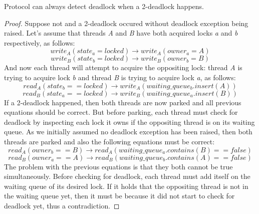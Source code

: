 \begin{lemma}
Protocol can always detect deadlock when a 2-deadlock happens.
\end{lemma}
\begin{proof}
Suppose not and a 2-deadlock occured without deadlock exception being raised.
Let's assume that threads \emph{A} and \emph{B} have both acquired locks \emph{a} and \emph{b} respectively, as follows:
\begin{equation}
write_{A}(state_{a} = locked) \rightarrow write_{A}(owner_{a} = A)
\end{equation}
\begin{equation}
write_{B}(state_{b} = locked) \rightarrow write_{B}(owner_{b} = B)
\end{equation}
And now each thread will attempt to acquire the oppositing lock: thread \emph{A} is trying to acquire lock \emph{b} and thread \emph{B} is trying to acquire lock \emph{a}, as follows:
\begin{equation}
read_{A}(state_{b} == locked) \rightarrow write_{A}(waiting\_queue_{b}.insert(A))
\end{equation}
\begin{equation}
read_{B}(state_{a} == locked) \rightarrow write_{B}(waiting\_queue_{a}.insert(B))
\end{equation}
If a 2-deadlock happened, then both threads are now parked and all previous equations should be correct.
But before parking, each thread must check for deadlock by inspecting each lock it owns if the oppositing thread is on its waiting queue.
As we initially assumed no deadlock exception has been raised, then both threads are parked and also the following equations must be correct:
\begin{equation}
read_{A}(owner_{b} == B) \rightarrow read_{A}(waiting\_queue_{a}.contains(B) == false)
\end{equation}
\begin{equation}
read_{B}(owner_{a} == A) \rightarrow read_{B}(waiting\_queue_{b}.contains(A) == false)
\end{equation}
The problem with the previous equations is that they both cannot be true simultaneously.
Before checking for deadlock, each thread must add itself on the waiting queue of its desired lock.
If it holds that the oppositing thread is not in the waiting queue yet, then it must be because it did not start to check for deadlock yet, thus a contradiction.
\end{proof}

